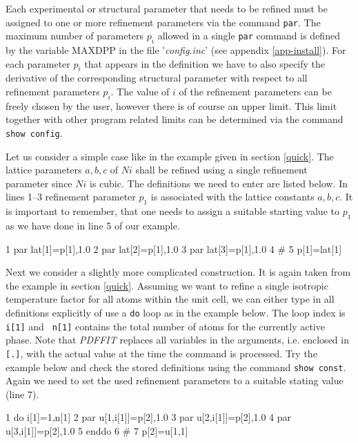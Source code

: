 Each experimental or structural parameter that needs to be refined must
be assigned to one or more refinement parameters via the command
{\tt par}. The maximum number of parameters $p_{i}$ allowed in a single
{\tt par} command is defined by the variable MAXDPP in the file
'{\it config.inc}' (see appendix \ref{app-install}). For each parameter
$p_{i}$ that appears in the definition we have to also specify the
derivative of the corresponding structural parameter with respect
to all refinement parameters $p_{i}$. The value of $i$ of the
refinement parameters can be freely chosen by the user, however
there is of course an upper limit. This limit together with other program
related limits can be determined via the command {\tt show config}. \par

Let us consider a simple case like in the example given in section
\ref{quick}.  The lattice parameters $a,b,c$ of $Ni$ shall be refined
using a single refinement parameter since $Ni$ is cubic. The definitions
we need to enter are listed below. In lines 1--3 refinement parameter
$p_{1}$ is associated with the lattice constants $a,b,c$. It is important
to remember, that one needs to assign a suitable starting value to
$p_{1}$ as we have done in line 5 of our example.

\footnotesize
\begin{MacVerbatim}
    1 par lat[1]=p[1],1.0
    2 par lat[2]=p[1],1.0
    3 par lat[3]=p[1],1.0
    4 #
    5 p[1]=lat[1]
\end{MacVerbatim}
\normalsize

\noindent Next we consider a slightly more complicated
construction. It is again taken from the example in section
\ref{quick}. Assuming we want to refine a single isotropic
temperature factor for all atoms within the unit cell, we can
either type in all definitions explicitly of use a {\tt do} loop
as in the example below. The loop index is {\tt i[1]} and {\tt
n[1]} contains the total number of atoms for the currently active
phase. Note that {\it PDFFIT} replaces all variables in the
arguments, i.e. enclosed in {\tt [.]}, with the actual value at
the time the command is processed. Try the example below and check
the stored definitions using the command {\tt show const}. Again
we need to set the used refinement parameters to a suitable
stating value (line 7).

\footnotesize
\begin{MacVerbatim}
    1 do i[1]=1,n[1]
    2   par u[1,i[1]]=p[2],1.0
    3   par u[2,i[1]]=p[2],1.0
    4   par u[3,i[1]]=p[2],1.0
    5 enddo
    6 #
    7 p[2]=u[1,1]
\end{MacVerbatim}
\normalsize


